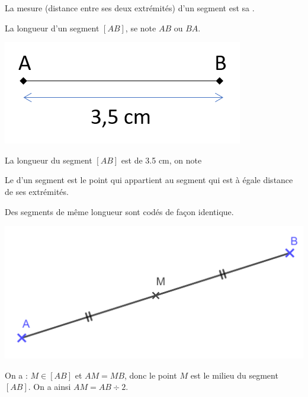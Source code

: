 \begin{mydef}
	La mesure (distance entre ses deux extrémités) d'un segment est sa .
\end{mydef}

\begin{myprop}
	La longueur d'un segment $[AB]$, se note $AB$ ou $BA$. 
\end{myprop}

\begin{myex}
	\vspace*{-0.5cm}
	\begin{center}
		\includegraphics[scale=0.8]{img/lgr}
	\end{center}
	\vspace*{-0.5cm}
	La longueur du segment $[AB]$ est de \num{3.5} cm, on note
\end{myex}

\begin{mydef}
	Le  d'un segment est le point qui appartient au segment  qui est à égale distance de ses extrémités.
\end{mydef}

\begin{myrem}
	Des segments de même longueur sont codés de façon identique.
\end{myrem}

\begin{myex}
	\begin{center}
		\includegraphics[scale=0.25]{img/milieu}
	\end{center}

	On a : $M \in [AB]$ et $AM = MB$, donc le point $M$ est le milieu du segment $[AB]$. On a ainsi $AM = AB \div 2$. 
\end{myex}